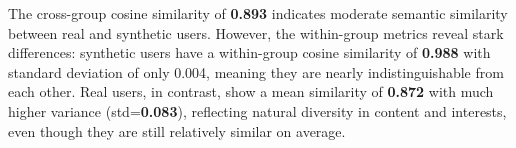 The cross-group cosine similarity of \textbf{0.893} indicates moderate semantic similarity between real and synthetic users. However, the within-group metrics reveal stark differences: synthetic users have a within-group cosine similarity of \textbf{0.988} with standard deviation of only 0.004, meaning they are nearly indistinguishable from each other. Real users, in contrast, show a mean similarity of \textbf{0.872} with much higher variance (std=\textbf{0.083}), reflecting natural diversity in content and interests, even though they are still relatively similar on average.







